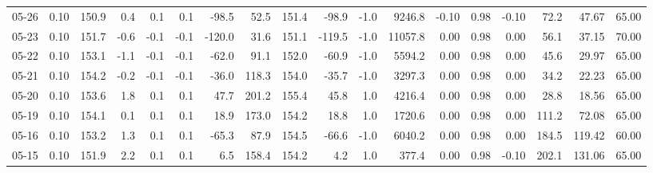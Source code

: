 \begin{threeparttable}
{\begin{tabular}{lrrrrrrrrrrrrrrrrr}
  05-26 &     0.10 & 150.9 &               0.4 &               0.1 &                0.1 &              -98.5 &   52.5 & 151.4 &      -98.9 &                     -1.0 &              9246.8 &      -0.10 &      0.98 &          -0.10 &             72.2 &           47.67 &                  65.00 \\
  05-23 &     0.10 & 151.7 &              -0.6 &              -0.1 &               -0.1 &             -120.0 &   31.6 & 151.1 &     -119.5 &                     -1.0 &             11057.8 &       0.00 &      0.98 &           0.00 &             56.1 &           37.15 &                  70.00 \\
  05-22 &     0.10 & 153.1 &              -1.1 &              -0.1 &               -0.1 &              -62.0 &   91.1 & 152.0 &      -60.9 &                     -1.0 &              5594.2 &       0.00 &      0.98 &           0.00 &             45.6 &           29.97 &                  65.00 \\
  05-21 &     0.10 & 154.2 &              -0.2 &              -0.1 &               -0.1 &              -36.0 &  118.3 & 154.0 &      -35.7 &                     -1.0 &              3297.3 &       0.00 &      0.98 &           0.00 &             34.2 &           22.23 &                  65.00 \\
  05-20 &     0.10 & 153.6 &               1.8 &               0.1 &                0.1 &               47.7 &  201.2 & 155.4 &       45.8 &                      1.0 &              4216.4 &       0.00 &      0.98 &           0.00 &             28.8 &           18.56 &                  65.00 \\
  05-19 &     0.10 & 154.1 &               0.1 &               0.1 &                0.1 &               18.9 &  173.0 & 154.2 &       18.8 &                      1.0 &              1720.6 &       0.00 &      0.98 &           0.00 &            111.2 &           72.08 &                  65.00 \\
  05-16 &     0.10 & 153.2 &               1.3 &               0.1 &                0.1 &              -65.3 &   87.9 & 154.5 &      -66.6 &                     -1.0 &              6040.2 &       0.00 &      0.98 &           0.00 &            184.5 &          119.42 &                  60.00 \\
  05-15 &     0.10 & 151.9 &               2.2 &               0.1 &                0.1 &                6.5 &  158.4 & 154.2 &        4.2 &                      1.0 &               377.4 &       0.00 &      0.98 &          -0.10 &            202.1 &          131.06 &                  65.00 \\

\end{tabular}}
\end{threeparttable}
